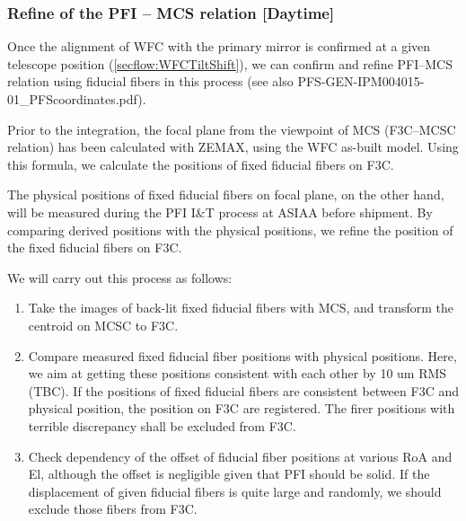 \subsubsection{Refine of the PFI -- MCS relation [Daytime]}\label{secflow:mcs2f3c}
Once the alignment of WFC with the primary mirror is confirmed at a given telescope position (\ref{secflow:WFCTiltShift}), we can confirm and refine PFI--MCS relation using fiducial fibers in this process (see also PFS-GEN-IPM004015-01\_PFScoordinates.pdf).

Prior to the integration, the focal plane from the viewpoint of MCS (F3C--MCSC relation) has been calculated with ZEMAX, using the WFC as-built model.
Using this formula, we calculate the positions of fixed fiducial fibers on F3C.

The physical positions of fixed fiducial fibers on focal plane, on the other hand, will be measured during the PFI I\&T process at ASIAA before shipment.
By comparing derived positions with the physical positions, we refine the position of the fixed fiducial fibers on F3C.

We will carry out this process as follows:
\begin{enumerate}
\item Take the images of back-lit fixed fiducial fibers with MCS, and transform the centroid on MCSC to F3C.
\item Compare measured fixed fiducial fiber positions with physical positions.
Here, we aim at getting these positions consistent with each other by 10 um RMS (TBC).
If the positions of fixed fiducial fibers are consistent between F3C and physical position, the position on F3C are registered.
The firer positions with terrible discrepancy shall be excluded from F3C.
\item Check dependency of the offset of fiducial fiber positions at various RoA and El, although the offset is negligible given that PFI should be solid.
If the displacement of given fiducial fibers is quite large and randomly, we should exclude those fibers from F3C.

\end{enumerate}

